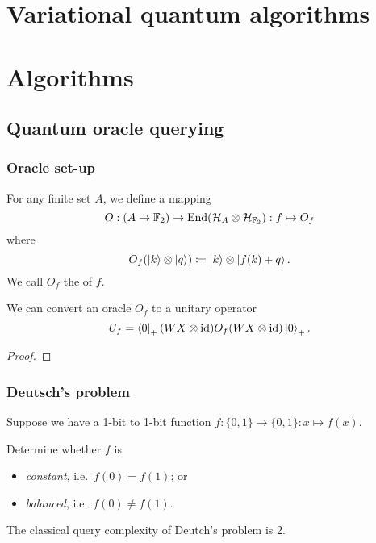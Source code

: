 \chapter{Variational quantum algorithms}

\chapter{Algorithms}
\section{Quantum oracle querying}
\subsection{Oracle set-up}
\begin{definition}
For any finite set $A$, we define a mapping
\[ O: (A\to \mathbb{F}_2) \to \operatorname{End}(\mathcal{H}_{A}\otimes \mathcal{H}_{\mathbb{F}_2}): f\mapsto O_f \]
where
\[ O_f(\left| k \right\rangle\otimes \left| q \right\rangle) \coloneqq \left| k \right\rangle\otimes \left| f(k) + q \right\rangle.  \]
We call $O_f$ the  of $f$.
\end{definition}

\begin{lemma}
We can convert an oracle $O_f$ to a unitary operator
\[ U_f = \left\langle 0 \right|_+(WX\otimes \operatorname{id})O_f(WX\otimes \operatorname{id})\left| 0 \right\rangle_+. \]
\end{lemma}
\begin{proof}

\end{proof}

\subsection{Deutsch's problem}
\begin{problem}
Suppose we have a 1-bit to 1-bit function $f: \{0,1\} \to \{0,1\}: x\mapsto f(x)$.

Determine whether $f$ is
\begin{itemize}
    \item \emph{constant}, i.e.\ $f(0) = f(1)$; or
    \item \emph{balanced}, i.e.\ $f(0) \neq f(1)$.
\end{itemize}
\end{problem}

\begin{lemma}
The classical query complexity of Deutch's problem is 2.
\end{lemma}



